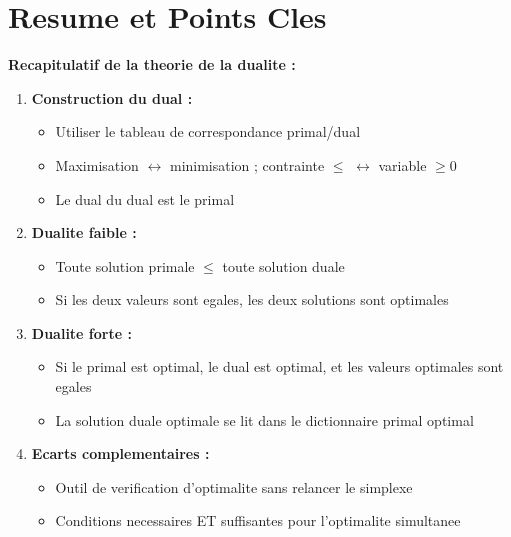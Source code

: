 \documentclass[12pt,a4paper]{article}
\begin{document}
\section{Resume et Points Cles}

\begin{important}
\textbf{Recapitulatif de la theorie de la dualite :}

\begin{enumerate}
    \item \textcolor{titrebleu}{\textbf{Construction du dual :}}
    \begin{itemize}
        \item Utiliser le tableau de correspondance primal/dual
        \item Maximisation $\leftrightarrow$ minimisation ; contrainte $\leq$ $\leftrightarrow$ variable $\geq 0$
        \item Le dual du dual est le primal
    \end{itemize}
    
    \item \textcolor{defvert}{\textbf{Dualite faible :}}
    \begin{itemize}
        \item Toute solution primale $\leq$ toute solution duale
        \item Si les deux valeurs sont egales, les deux solutions sont optimales
    \end{itemize}
    
    \item \textcolor{algoviolet}{\textbf{Dualite forte :}}
    \begin{itemize}
        \item Si le primal est optimal, le dual est optimal, et les valeurs optimales sont egales
        \item La solution duale optimale se lit dans le dictionnaire primal optimal
    \end{itemize}
    
    \item \textcolor{importantrouge}{\textbf{Ecarts complementaires :}}
    \begin{itemize}
        \item Outil de verification d'optimalite sans relancer le simplexe
        \item Conditions necessaires ET suffisantes pour l'optimalite simultanee
    \end{itemize}
\end{enumerate}
\end{important}
\end{document}
